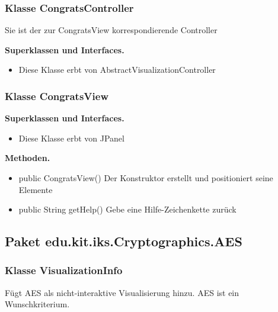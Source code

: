 \documentclass{article}
\begin{document}
	\subsubsection{Klasse CongratsController}
    Sie ist der zur CongratsView korrespondierende Controller\newline
    
	    \textbf{Superklassen und Interfaces.}\newline
        \begin{itemize}
            \item Diese Klasse erbt von AbstractVisualizationController \newline
           \end{itemize}

	\subsubsection{Klasse CongratsView}

	    \textbf{Superklassen und Interfaces.}\newline
        \begin{itemize}
            \item Diese Klasse erbt von JPanel \newline
           \end{itemize}

    \textbf{Methoden.}\newline
	   \begin{itemize}
           \item public CongratsView() \newline
               Der Konstruktor erstellt und positioniert seine Elemente\newline
           \item public String getHelp() \newline
               Gebe eine Hilfe-Zeichenkette zurück\newline
           \end{itemize}

  \subsection{Paket edu.kit.iks.Cryptographics.AES}
    \subsubsection{Klasse VisualizationInfo}
      Fügt AES als nicht-interaktive Visualisierung hinzu. AES ist ein Wunschkriterium.\newline
      
\end{document}
